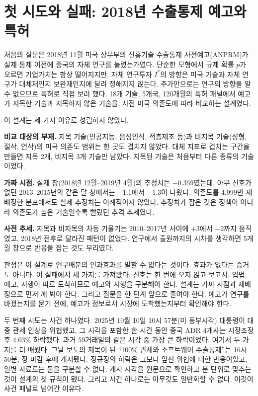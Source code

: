 \documentclass[11pt,a4paper]{article}
\begin{document}
\section{첫 시도와 실패: 2018년 수출통제 예고와 특허}

처음의 질문은 2018년 11월 미국 상무부의 신흥기술 수출통제 사전예고(ANPRM)가 실제 통제 이전에 중국의 자체 연구를 늘렸는가였다. 단순한 모형에서 규제 확률 $p$가 오르면 기업가치는 항상 떨어지지만, 자체 연구투자 $I^{*}$의 방향은 미국 기술과 자체 연구가 대체재인지 보완재인지에 달려 정해지지 않는다. 주가만으로는 연구의 방향을 알 수 없으므로 특허로 직접 보려 했다. 18개 기술, 5개국, 120개월의 특허 패널에서 예고가 지목한 기술과 지목하지 않은 기술을, 사전 미국 의존도에 따라 비교하는 설계였다.

이 설계는 세 가지 이유로 성립하지 않았다.

\textbf{비교 대상의 부재.} 지목 기술(인공지능, 음성인식, 적층제조 등)과 비지목 기술(성형, 절삭, 연삭)의 미국 의존도 범위는 한 곳도 겹치지 않았다. 대체 지표로 겹치는 구간을 만들면 지목 2개, 비지목 3개 기술만 남았다. 지목된 기술은 처음부터 다른 종류의 기술이었다.

\textbf{가짜 시점.} 실제 창(2018년 12월--2019년 4월)의 추정치는 $-0.359$였는데, 아무 신호가 없던 2013--2015년의 같은 달 창에서는 $-1.1$에서 $-1.3$이 나왔다. 의존도를 4,999번 재배정한 분포에서도 실제 추정치는 이례적이지 않았다. 추정치가 잡은 것은 정책이 아니라 의존도가 높은 기술일수록 빨랐던 추격 추세였다.

\textbf{사전 추세.} 지목과 비지목의 차등 기울기는 2010--2017년 사이에 $+3$에서 $-2$까지 움직였고, 2018년 전후로 달라진 패턴이 없었다. 연구에서 출원까지의 시차를 생각하면 5개월 창으로 반응을 잡는 것도 무리였다.

판정은 이 설계로 연구배분의 인과효과를 말할 수 없다는 것이다. 효과가 없다는 증거도 아니다. 이 실패에서 세 가지를 가져왔다. 신호는 한 번에 오지 않고 보고서, 입법, 예고, 시행이 따로 도착하므로 예고와 시행을 구분해야 한다. 설계는 가짜 시점과 재배정으로 먼저 깨 봐야 한다. 그리고 질문을 한 단계 앞으로 줄여야 한다. 예고가 연구를 바꿨는지를 묻기 전에, 예고가 정보로서 시장에 도착했는지부터 확인해야 한다.

두 번째 시도는 사건 하나였다. 2025년 10월 10일 10시 57분(미 동부시각) 대통령이 대중 관세 인상을 위협했고, 그 시각을 포함한 한 시간 동안 중국 ADR 4개사는 시장조정 후 4.03\% 하락했다. 과거 59거래일의 같은 시각 중 가장 큰 하락이었다. 여기서 두 가지를 더 배웠다. 그날 보도의 제목이 된 ``100\% 관세와 소프트웨어 수출통제''는 16시 50분, 장 마감 후에 게시됐다. 정규장의 하락은 그보다 앞선 위협에 대한 반응이었고, 일별 자료로는 둘을 구분할 수 없다. 게시 시각을 원문으로 확인하고 분 단위로 맞추는 것이 설계의 첫 규칙이 됐다. 그리고 사건 하나로는 아무것도 일반화할 수 없다. 이것이 사건 패널로 넘어간 이유다.
\end{document}
